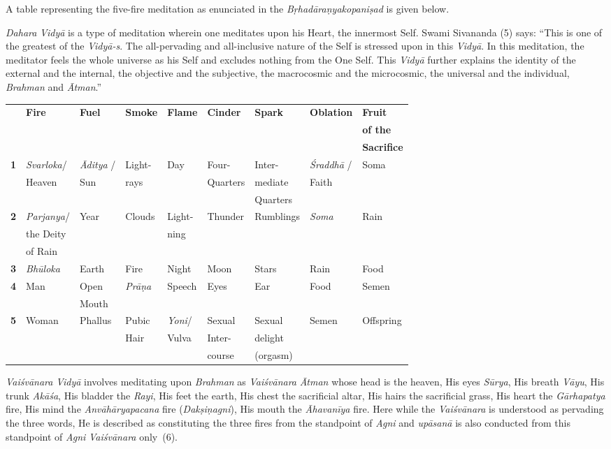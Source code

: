 A table representing the five-fire meditation as enunciated in the \emph{Bṛhadāraṇyakopaniṣad} is given below.

\emph{Dahara} \emph{Vidyā} is a type of meditation wherein one meditates upon his Heart, the innermost Self. Swami Sivananda (5) says: ``This is one of the greatest of the \emph{Vidyā-s}. The all-pervading and all-inclusive nature of the Self is stressed upon in this \emph{Vidyā}. In this meditation, the meditator feels the whole universe as his Self and excludes nothing from the One Self. This \emph{Vidyā} further explains the identity of the external and the internal, the objective and the subjective, the macrocosmic and the microcosmic, the universal and the individual, \emph{Brahman} and \emph{Ātman}.''
\newpage

{\tabcolsep=4pt\fontsize{7}{9}\selectfont
\begin{longtable}{|l|l|l|l|l|l|l|l|l|}
\hline
 & \textbf{Fire} & \textbf{Fuel} & \textbf{Smoke} & \textbf{Flame} & \textbf{Cinder} & \textbf{Spark} & \textbf{Oblation} & \textbf{Fruit}\tabularnewline
 & & & & & & & &\textbf{of the}\tabularnewline
 & & & & & & & &\textbf{Sacrifice}\tabularnewline
\hline
\textbf{1} & \emph{Svarloka}/ & \emph{Āditya} / & Light- & Day & Four- & Inter- & \emph{Śraddhā} /  & Soma\tabularnewline
& Heaven & Sun & rays & & Quarters & mediate & Faith &\tabularnewline
&  &  &  & &  & Quarters &  &\tabularnewline
\hline
\textbf{2} & \emph{Parjanya}/ & Year & Clouds & Light- & Thunder & Rumblings & \emph{Soma} & Rain\tabularnewline
& the Deity &  &  & ning &  &  &  &\tabularnewline
& of Rain &  &  &  &  &  &  & \tabularnewline
\hline
\textbf{3} & \emph{Bhūloka} & Earth & Fire & Night & Moon & Stars & Rain & Food\tabularnewline
\hline
\textbf{4} & Man & Open & \emph{Prāṇa} & Speech & Eyes & Ear & Food & Semen\tabularnewline
& & Mouth &  &  &  &  &  &\tabularnewline
\hline
\textbf{5} & Woman & Phallus & Pubic & \emph{Yoni}/ & Sexual & Sexual  & Semen & Offspring\tabularnewline
&  &  & Hair & Vulva & Inter- & delight &  &\tabularnewline
& &  &  &  & course & (orgasm) &  &\tabularnewline
\hline
\end{longtable}}



\emph{Vaiśvānara} \emph{Vidyā} involves meditating upon \emph{Brahman} as \emph{Vaiśvānara} \emph{Ātman} whose head is the heaven, His eyes \emph{Sūrya}, His breath \emph{Vāyu}, His trunk \emph{Akāśa}, His bladder the \emph{Rayi}, His feet the earth, His chest the sacrificial altar, His hairs the sacrificial grass, His heart the \emph{Gārhapatya} fire, His mind the \emph{Anvāhāryapacana} fire (\emph{Dakṣiṇa\-gni}), His mouth the \emph{Āhavanīya} fire. Here while the \emph{Vaiśvānara} is understood as pervading the three words, He is described as constituting the three fires from the standpoint of \emph{Agni} and \emph{upāsanā} is also conducted from this standpoint of \emph{Agni} \emph{Vaiśvānara} only~(6).

